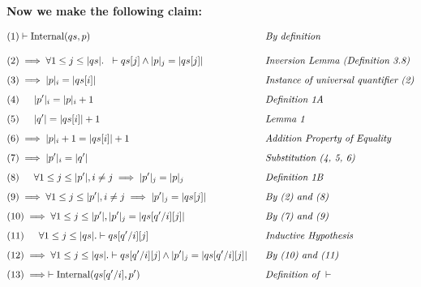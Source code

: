 \documentclass{article}
\begin{document}
\noindent \textbf{Now we make the following claim:}

\begin{alignat*}{5}
&(1) \vdash \text{Internal}(qs, p) && \hspace{0.3cm} \textit{By definition}\\[10pt]
&(2) \implies \forall 1 \leq j \leq |qs|. \hspace{0.2cm} \vdash qs[j] \land |p|_j = |qs[j]|&& \hspace{0.3cm} \textit{Inversion Lemma (Definition 3.8)}\\[5pt]
&(3) \implies |p|_i = |qs[i]|&& \hspace{0.3cm} \textit{Instance of universal quantifier (2)}\\[5pt]
&(4) \indent |p'|_i = |p|_i + 1&& \hspace{0.3cm} \textit{Definition 1A}\\[5pt]
&(5) \indent |q'| = |qs[i]| + 1&& \hspace{0.3cm} \textit{Lemma 1}\\[5pt]
&(6) \implies |p|_i + 1 = |qs[i]| + 1&& \hspace{0.3cm} \textit{Addition Property of Equality}\\[5pt]
&(7) \implies |p'|_i = |q'|&& \hspace{0.3cm} \textit{Substitution (4, 5, 6)}\\[5pt]
&(8) \indent \forall 1 \leq j \leq |p'|, i \neq j \implies |p'|_j = |p|_j&& \hspace{0.3cm} \textit{Definition 1B}\\[5pt]
&(9) \implies \forall 1 \leq j \leq |p'|, i \neq j \implies |p'|_j = |qs[j]|&& \hspace{0.3cm} \textit{By (2) and (8)}\\[5pt]
&(10) \implies \forall 1 \leq j \leq |p'|, |p'|_j = |qs[q' / i][j]|&& \hspace{0.3cm} \textit{By (7) and (9)}\\[5pt]
&(11)  \indent \forall 1 \leq j \leq |qs|. \vdash qs[q'/i][j]&& \hspace{0.3cm} \textit{Inductive Hypothesis}\\[5pt]
&(12) \implies \forall 1 \leq j \leq |qs|. \vdash qs[q'/i][j] \land |p'|_j = |qs[q'/i][j]|&&\hspace{0.3cm} \textit{By (10) and (11)}\\[5pt]
&(13) \implies \vdash \text{Internal}(qs[q'/i], p') && \hspace{0.3cm} \textit{Definition of } \vdash\\[-10pt]
\end{alignat*}
\end{document}
